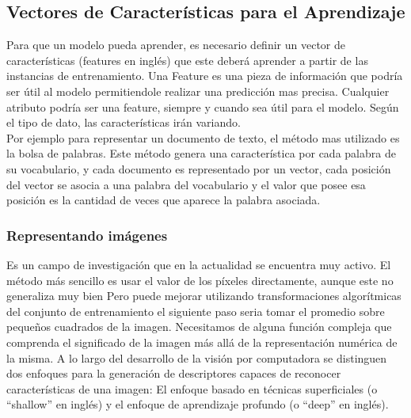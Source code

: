 \documentclass[a4paper,11pt,spanish]{book}
\begin{document}
    \subsection{Vectores de Características para el Aprendizaje}
      Para que un modelo pueda aprender, es necesario definir un vector de características (features en inglés) que este deberá aprender a partir de las instancias de entrenamiento.
      Una Feature es una pieza de información que podría ser útil al modelo permitiendole realizar una predicción mas precisa. Cualquier atributo podría ser una feature, siempre y cuando sea útil para el modelo.
      Según el tipo de dato, las características irán variando. \\
      Por ejemplo para representar un documento de texto, el método mas utilizado es la bolsa de palabras.
      Este método genera una característica por cada palabra de su vocabulario, y cada documento es representado por un vector, cada posición del vector se asocia a una palabra del
      vocabulario y el valor que posee esa posición es la cantidad de veces que aparece la palabra asociada.

      \subsubsection{Representando imágenes}
	Es un campo de investigación que en la actualidad se encuentra muy activo. El método más sencillo es usar el valor de los píxeles directamente, aunque este no generaliza muy bien
	Pero puede mejorar utilizando transformaciones algorítmicas del conjunto de entrenamiento el siguiente paso seria tomar el promedio sobre pequeños cuadrados de la imagen.
	Necesitamos de alguna función compleja que comprenda el significado de la imagen más allá de la representación numérica de la misma.
	A lo largo del desarrollo de la visión por computadora se distinguen dos enfoques para la generación de descriptores capaces de reconocer características de una imagen:
	El enfoque basado en técnicas superficiales (o “shallow” en inglés) y el enfoque de aprendizaje profundo (o “deep” en inglés).
\end{document}
